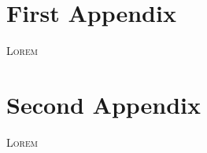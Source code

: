 \documentclass[a4paper,oneside,11pt]{memoir}
\begin{document}
%
%
%
%
%
%
%
%

\appendixpage
\appendix
{}
\chapter{First Appendix}
\lettrine{\textcolor[gray]{0.5}{L}}{orem} \lipsum[1-2]

\chapter{Second Appendix}
\lettrine{\textcolor[gray]{0.5}{L}}{orem} \lipsum[1-2]
\end{document}
